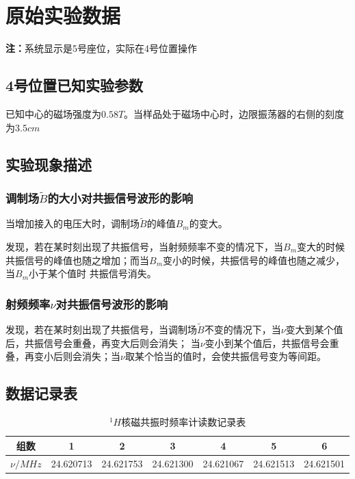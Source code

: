 \documentclass[a4paper,UTF8]{ctexart}
\begin{document}
\section{原始实验数据}

{\bfseries 注：}系统显示是5号座位，实际在4号位置操作

\subsection{4号位置已知实验参数}

已知中心的磁场强度为$0.58T$。当样品处于磁场中心时，边限振荡器的右侧的刻度为$3.5cm$

\subsection{实验现象描述}

\subsubsection{调制场$\tilde{B}$的大小对共振信号波形的影响}

当增加接入的电压大时，调制场$\tilde{B}$的峰值$B_m$的变大。

发现，若在某时刻出现了共振信号，当射频频率不变的情况下，当$B_m$变大的时候共振信号的峰值也随之增加；而当$B_m$变小的时候，共振信号的峰值也随之减少，当$B_m$小于某个值时
共振信号消失。

\subsubsection{射频频率$\nu$对共振信号波形的影响}

发现，若在某时刻出现了共振信号，当调制场$\tilde{B}$不变的情况下，当$\nu$变大到某个值后，共振信号会重叠，再变大后则会消失；
当$\nu$变小到某个值后，共振信号会重叠，再变小后则会消失；当$\nu$取某个恰当的值时，会使共振信号变为等间距。

\subsection{数据记录表}

\begin{table}[H]
    \centering
    \begin{tabular}{|c|c|c|c|c|c|c|}
    \hline
        组数 & 1 & 2 & 3 & 4 & 5 & 6 \\ \hline
        $\nu /MHz$ & 24.620713 & 24.621753 & 24.621300 & 24.621067 & 24.621513 & 24.621501 \\ \hline
    \end{tabular}
    \caption{$^1H$核磁共振时频率计读数记录表}
\end{table}
\end{document}
